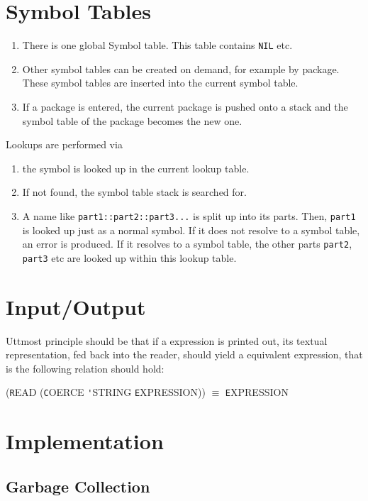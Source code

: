 \documentclass[12pt]{article}
\begin{document}
\section{Symbol Tables}

\begin{enumerate}
\item There is one global Symbol table. This table contains \texttt{NIL} etc.
\item Other symbol tables can be created on demand, for example by package.
These symbol tables are inserted into the current symbol table.
\item If a package is entered, the current package is pushed onto a stack and
the symbol table of the package becomes the new one.
\end{enumerate}

Lookups are performed via

\begin{enumerate}
\item the symbol is looked up in the current lookup table.
\item If not found, the symbol table stack is searched for.
\item A name like \texttt{part1::part2::part3...} is split up into its parts. Then,
\texttt{part1} is looked up just as a normal symbol. If it does not resolve to a symbol
table, an error is produced. If it resolves to a symbol table, the other parts
\texttt{part2}, \texttt{part3} etc are looked up within this lookup table.
\end{enumerate}


\section{Input/Output}

Uttmost principle should be that if a expression is printed out, its textual
representation, fed back into the reader, should yield a equivalent expression,
that is the following relation should hold:

({\texttt READ} ({\texttt COERCE} {\texttt 'STRING} {\texttt EXPRESSION})) $\equiv$ {\texttt EXPRESSION}

\section{Implementation}

\subsection{Garbage Collection}
\end{document}
